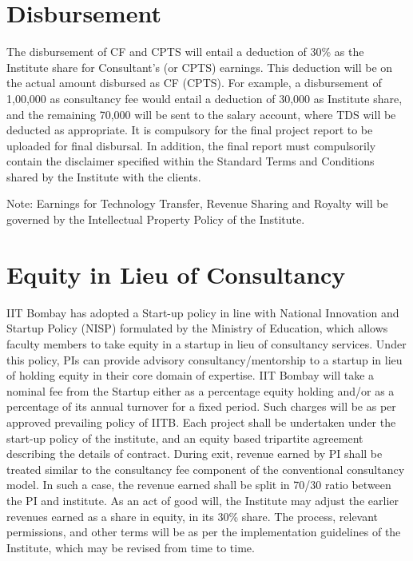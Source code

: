\documentclass[
  10pt,
  a5paper,
  10pt,
  openany]{amsbook}
\begin{document}
\section{Disbursement}\label{disbursement}

The disbursement of CF and CPTS will entail a deduction of 30\% as the
Institute share for Consultant's (or CPTS) earnings. This deduction will
be on the actual amount disbursed as CF (CPTS). For example, a
disbursement of  1,00,000 as consultancy fee would entail a
deduction of  30,000 as Institute share, and the remaining
 70,000 will be sent to the salary account, where TDS will be
deducted as appropriate. It is compulsory for the final project report
to be uploaded for final disbursal. In addition, the final report must
compulsorily contain the disclaimer specified within the Standard Terms
and Conditions shared by the Institute with the clients.

Note: Earnings for Technology Transfer, Revenue Sharing and Royalty will
be governed by the Intellectual Property Policy of the Institute.

\section{Equity in Lieu of
Consultancy}\label{equity-in-lieu-of-consultancy}

IIT Bombay has adopted a Start-up policy in line with National
Innovation and Startup Policy (NISP) formulated by the Ministry of
Education, which allows faculty members to take equity in a startup in
lieu of consultancy services. Under this policy, PIs can provide
advisory consultancy/mentorship to a startup in lieu of holding equity
in their core domain of expertise. IIT Bombay will take a nominal fee
from the Startup either as a percentage equity holding and/or as a
percentage of its annual turnover for a fixed period. Such charges will
be as per approved prevailing policy of IITB. Each project shall be
undertaken under the start-up policy of the institute, and an equity
based tripartite agreement describing the details of contract. During
exit, revenue earned by PI shall be treated similar to the consultancy
fee component of the conventional consultancy model. In such a case, the
revenue earned shall be split in 70/30 ratio between the PI and
institute. As an act of good will, the Institute may adjust the earlier
revenues earned as a share in equity, in its 30\% share. The process,
relevant permissions, and other terms will be as per the implementation
guidelines of the Institute, which may be revised from time to time.
\end{document}
